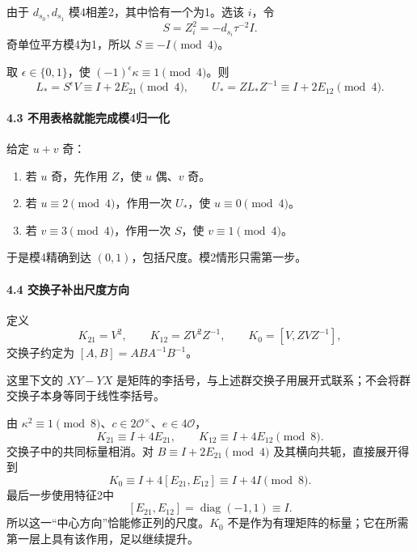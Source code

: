 {由于} \(d_{s_0},d_{s_1}\) {模4相差2，其中恰有一个为1。选该} \(i\){，令} \[
S=Z_i^2=-d_{s_i}\tau^{-2}I.
\] {奇单位平方模4为1，所以} \(S\equiv-I\pmod4\){。}

{取} \(\epsilon\in\{0,1\}\){，使} \((-1)^\epsilon\kappa\equiv1\pmod4\){。则} \[
L_*=S^\epsilon V\equiv I+2E_{21}\pmod4,\qquad
U_*=ZL_*Z^{-1}\equiv I+2E_{12}\pmod4.
\tag{C15.4.2}
\]

\paragraph*{\texorpdfstring{{4.3} {不用表格就能完成模4归一化}}{4.3 不用表格就能完成模4归一化}}\label{C15-h110}

{给定} \(u+v\) {奇：}

\begin{enumerate}
\def\labelenumi{\arabic{enumi}.}
\tightlist
\item
  {若} \(u\) {奇，先作用} \(Z\){，使} \(u\) {偶、}\(v\) {奇。}
\item
  {若} \(u\equiv2\pmod4\){，作用一次} \(U_*\){，使} \(u\equiv0\pmod4\){。}
\item
  {若} \(v\equiv3\pmod4\){，作用一次} \(S\){，使} \(v\equiv1\pmod4\){。}
\end{enumerate}

{于是模4精确到达} \((0,1)\){，包括尺度。模2情形只需第一步。}

\paragraph*{\texorpdfstring{{4.4} {交换子补出尺度方向}}{4.4 交换子补出尺度方向}}\label{C15-h111}

{定义} \[
K_{21}=V^2,\qquad K_{12}=ZV^2Z^{-1},\qquad
K_0=[V,ZVZ^{-1}],
\] {交换子约定为} \([A,B]=ABA^{-1}B^{-1}\){。}

{这里下文的} \(XY-YX\) {是矩阵的李括号，与上述群交换子用展开式联系；不会将群交换子本身等同于线性李括号。}

{由} \(\kappa^2\equiv1\pmod8\){、}\(c\in2\mathcal O^\times\){、}\(e\in4\mathcal O\){，} \[
K_{21}\equiv I+4E_{21},\qquad
K_{12}\equiv I+4E_{12}\pmod8.
\tag{C15.4.3}
\] {交换子中的共同标量相消。对} \(B\equiv I+2E_{21}\pmod4\) {及其横向共轭，直接展开得到} \[
K_0\equiv I+4[E_{21},E_{12}]
       \equiv I+4I\pmod8.
\tag{C15.4.4}
\] {最后一步使用特征2中} \[
[E_{21},E_{12}]=\operatorname{diag}(-1,1)\equiv I.
\] {所以这一``中心方向''恰能修正列的尺度。}\(K_0\) {不是作为有理矩阵的标量；它在所需第一层上具有该作用，足以继续提升。}

